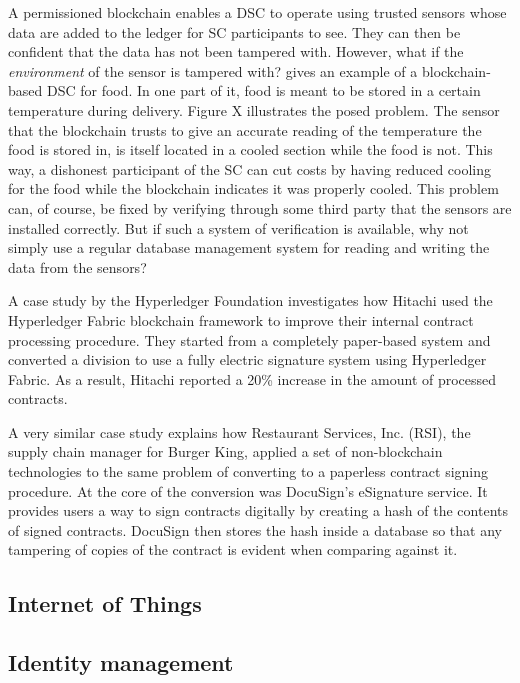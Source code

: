 A permissioned blockchain enables a DSC to operate using trusted
sensors whose data are added to the ledger for SC participants to see.
They can then be confident that the data has not been tampered with.
However, what if the \textit{environment} of the sensor is tampered
with? \cite{wustBlockchainNeed} gives an example of a blockchain-based
DSC for food. In one part of it, food is meant to be stored in a
certain temperature during delivery. Figure X illustrates the posed
problem. The sensor that the blockchain trusts to give an accurate
reading of the temperature the food is stored in, is itself located in
a cooled section while the food is not. This way, a dishonest
participant of the SC can cut costs by having reduced cooling for the
food while the blockchain indicates it was properly cooled. This
problem can, of course, be fixed by verifying through some third party
that the sensors are installed correctly. But if such a system of
verification is available, why not simply use a regular database
management system for reading and writing the data from the sensors?


A case study by the Hyperledger Foundation \cite{hyperledgerHitachi}
investigates how Hitachi used the Hyperledger Fabric blockchain framework
to improve their internal contract processing procedure. They started
from a completely paper-based system and converted a division to use
a fully electric signature system using Hyperledger Fabric. As a result,
Hitachi reported a 20\% increase in the amount of processed contracts.

A very similar case study \cite{docusignBurger} explains how
Restaurant Services, Inc. (RSI), the supply chain manager for Burger
King, applied a set of non-blockchain technologies to the same problem
of converting to a paperless contract signing procedure. At the core
of the conversion was DocuSign's eSignature service. It provides users
a way to sign contracts digitally by creating a hash of the contents of
signed contracts. DocuSign then stores the hash inside a database so
that any tampering of copies of the contract is evident when comparing
against it.



\subsection{Internet of Things}

\subsection{Identity management}

\subsection{}
